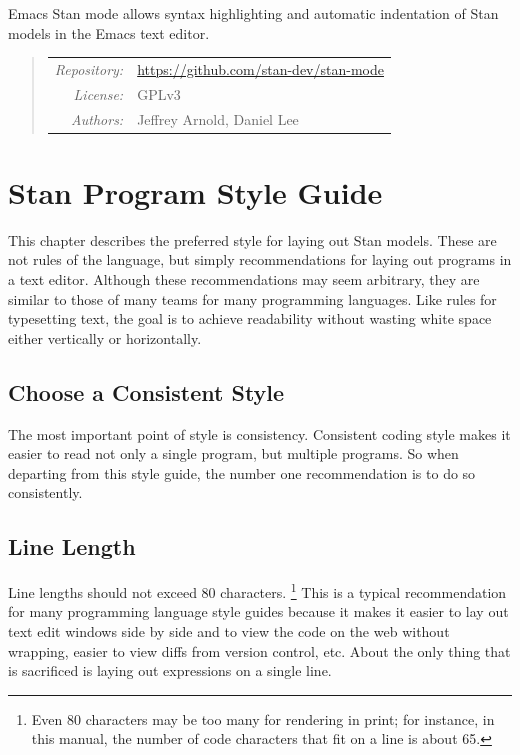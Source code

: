 \noindent
Emacs Stan mode allows syntax highlighting and automatic indentation
of Stan models in the Emacs text editor.

\begin{quote}
\begin{tabular}{rl}
{\it Repository:} & \url{https://github.com/stan-dev/stan-mode}
\\[4pt]
{\it License:} & GPLv3
\\[4pt]
{\it Authors:} & Jeffrey Arnold, Daniel Lee
\end{tabular}
\end{quote}

\chapter{Stan Program Style Guide}

\noindent
This chapter describes the preferred style for laying out Stan
models. These are not rules of the language, but simply
recommendations for laying out programs in a text editor.  Although
these recommendations may seem arbitrary, they are similar to those of
many teams for many programming languages.  Like rules for typesetting
text, the goal is to achieve readability without wasting white space
either vertically or horizontally.

\section{Choose a Consistent Style}

The most important point of style is consistency.  Consistent coding
style makes it easier to read not only a single program, but multiple
programs.  So when departing from this style guide, the number one
recommendation is to do so consistently.

\section{Line Length}

Line lengths should not exceed 80 characters.%
%
\footnote{Even 80 characters may be too many for rendering in print;
  for instance, in this manual, the number of code characters that fit
  on a line is about 65.}
%
This is a typical recommendation for many programming language style
guides because it makes it easier to lay out text edit windows side by
side and to view the code on the web without wrapping, easier to view
diffs from version control, etc.  About the only thing that is
sacrificed is laying out expressions on a single line.

